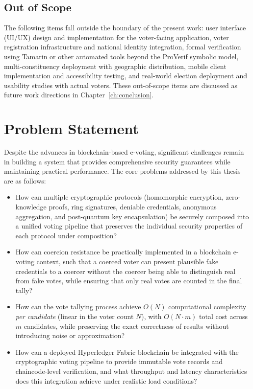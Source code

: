 \subsection{Out of Scope}
The following items fall outside the boundary of the present work: user interface (UI/UX) design and implementation for the voter-facing application, voter registration infrastructure and national identity integration, formal verification using Tamarin or other automated tools beyond the ProVerif symbolic model, multi-constituency deployment with geographic distribution, mobile client implementation and accessibility testing, and real-world election deployment and usability studies with actual voters. These out-of-scope items are discussed as future work directions in Chapter~\ref{ch:conclusion}.

\section{Problem Statement}
\label{sec:problem-statement}

Despite the advances in blockchain-based e-voting, significant challenges remain in building a system that provides comprehensive security guarantees while maintaining practical performance. The core problems addressed by this thesis are as follows:

\begin{itemize}
    \item How can multiple cryptographic protocols (homomorphic encryption, zero-knowledge proofs, ring signatures, deniable credentials, anonymous aggregation, and post-quantum key encapsulation) be securely composed into a unified voting pipeline that preserves the individual security properties of each protocol under composition?
    
    \item How can coercion resistance be practically implemented in a blockchain e-voting context, such that a coerced voter can present plausible fake credentials to a coercer without the coercer being able to distinguish real from fake votes, while ensuring that only real votes are counted in the final tally?
    
    \item How can the vote tallying process achieve $O(N)$ computational complexity \emph{per candidate} (linear in the voter count $N$), with $O(N \cdot m)$ total cost across $m$ candidates, while preserving the exact correctness of results without introducing noise or approximation?

    \item How can a deployed Hyperledger Fabric blockchain be integrated with the cryptographic voting pipeline to provide immutable vote records and chaincode-level verification, and what throughput and latency characteristics does this integration achieve under realistic load conditions?
\end{itemize}

